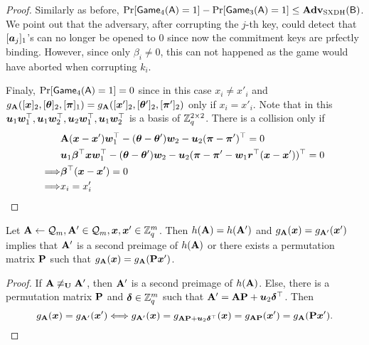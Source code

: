 \begin{proof}
Similarly as before, $\Pr[\mathsf{Game}_4(\mathsf{A})=1]-\Pr[\mathsf{Game}_3(\mathsf{A})=1]\leq\mathbf{Adv}_\mathrm{SXDH}(\mathsf{B})$. We point out that the adversary, after corrupting the $j$-th key, could detect that $[{\boldsymbol{a}}_j]_1$'s  can no longer be opened to 0 since now the commitment keys are prfectly binding. However, since only $\beta_i\neq 0$, this can not happened as the game would have aborted when corrupting $k_i$.

Finaly, $\Pr[\mathsf{Game}_4(\mathsf{A})=1]=0$ since in this case $x_i \neq x'_i$ and $g_{\mathbf{{A}}}([{\boldsymbol{x}}]_2,[{\boldsymbol{\theta}}]_2,\allowbreak[{\boldsymbol{\pi}}]_1)=g_{\mathbf{{A}}}([{\boldsymbol{x}}']_2,[{\boldsymbol{\theta}}']_2,[{\boldsymbol{\pi}}']_2)$  only if $x_i = x'_i$. Note that in this ${\boldsymbol{u}}_1{\boldsymbol{w}}_1^\top,{\boldsymbol{u}}_1{\boldsymbol{w}}_2^\top,{\boldsymbol{u}}_2{\boldsymbol{w}}_1^\top,{\boldsymbol{u}}_1{\boldsymbol{w}}_2^\top$ is a basis of $\mathbb{Z}_q^{2\times 2}$. There is a collision only if
\begin{align*}
&\matr{A}(\vecb{x}-\vecb{x}')\vecb{w}_1^\top - (\vec{\theta}-\vecb{\theta}')\vecb{w}_2 - \vecb{u}_2(\vecb{\pi}-\vecb{\pi}')^\top = 0\\
&\vecb{u}_1\vecb{\beta}^\top\vecb{x}\vecb{w}_1^\top - (\vec{\theta}-\vecb{\theta}')\vecb{w}_2 - \vecb{u}_2(\vecb{\pi}-\vecb{\pi}'-\vecb{w}_1\vecb{r}^\top(\vecb{x}-\vecb{x}'))^\top = 0\\
\Longrightarrow & \vecb{\beta}^\top(\vecb{x}-\vecb{x}') = 0\\
\Longrightarrow & x_i  = x'_i\\
\end{align*}
\end{proof}

\begin{lemma}\label{lemma:hg-sxdh}
Let $\mathbf{{A}}\gets \mathcal{Q}_m,\mathbf{{A}}'\in \mathcal{Q}_m,{\boldsymbol{x}},{\boldsymbol{x}}'\in\mathbb{Z}_q^m$. Then $h(\mathbf{{A}})=h(\mathbf{{A}}')$ and $g_{\mathbf{{A}}}({\boldsymbol{x}})=g_{\mathbf{{A}}'}({\boldsymbol{x}}')$ implies that $\mathbf{{A}}'$ is a second preimage of $h(\mathbf{{A}})$ or there exists a permutation matrix $\mathbf{{P}}$ such that $g_{\mathbf{{A}}}({\boldsymbol{x}})=g_{\mathbf{{A}}}(\mathbf{{P}}{\boldsymbol{x}}')$.
\end{lemma}
\begin{proof}
If $\mathbf{{A}}\not\equiv_{\mathbf{{U}}} \mathbf{{A}}'$, then $\mathbf{{A}}'$ is a second preimage of $h(\mathbf{{A}})$. Else, there is a permutation matrix $\mathbf{{P}}$ and ${\boldsymbol{\delta}}\in\mathbb{Z}_q^m$ such that $\mathbf{{A}}' =\mathbf{{A}}\mathbf{{P}}+{\boldsymbol{u}}_2{\boldsymbol{\delta}}^\top$. Then
$$
 g_{\mathbf{{A}}}({\boldsymbol{x}})=g_{\mathbf{{A}}'}({\boldsymbol{x}}')\Longleftrightarrow  g_{\mathbf{{A}}'}({\boldsymbol{x}})=g_{\mathbf{{A}}\mathbf{{P}}+{\boldsymbol{u}}_2{\boldsymbol{\delta}}^\top}({\boldsymbol{x}})=g_{\mathbf{{A}}\mathbf{{P}}}({\boldsymbol{x}}')=g_{\mathbf{{A}}}(\mathbf{{P}}{\boldsymbol{x}}').
$$
\end{proof}